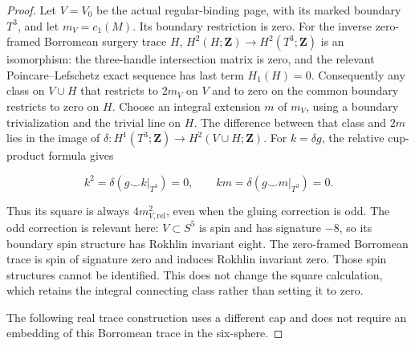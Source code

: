 \begin{proof}
Let \(V=V_0\) be the actual regular-binding page, with its marked
boundary \(T^3\), and let \(m_V=c_1(M)\).  Its boundary restriction is
zero.  For the inverse zero-framed Borromean surgery trace \(H\),
\(H^2(H;\mathbf Z)\to H^2(T^3;\mathbf Z)\) is an isomorphism: the
three-handle intersection matrix is zero, and the relevant
Poincare–Lefschetz exact sequence has last term \(H_1(H)=0\).
Consequently any class on \(V\cup H\) that restricts to \(2m_V\) on
\(V\) and to zero on the common boundary restricts to zero on \(H\).
Choose an integral extension \(m\) of \(m_V\), using a boundary
trivialization and the trivial line on \(H\).  The difference between
that class and \(2m\) lies in the image of
\(\delta:H^1(T^3;\mathbf Z)\to H^2(V\cup H;\mathbf Z)\).
For \(k=\delta g\), the relative cup-product formula gives

\[
 k^2=\delta(g\smile k|_{T^3})=0,\qquad
 km=\delta(g\smile m|_{T^3})=0.
\]

Thus its square is always \(4m_{V,\mathrm{rel}}^2\), even when the
gluing correction is odd.  The odd correction is relevant here:
\(V\subset S^5\) is spin and has signature \(-8\), so its boundary
spin structure has Rokhlin invariant eight.  The zero-framed
Borromean trace is spin of signature zero and induces Rokhlin
invariant zero.  Those spin structures cannot be identified.  This
does not change the square calculation, which retains the integral
connecting class rather than setting it to zero.

The following real trace construction uses a different cap and does
not require an embedding of this Borromean trace in the six-sphere.
\end{proof}

